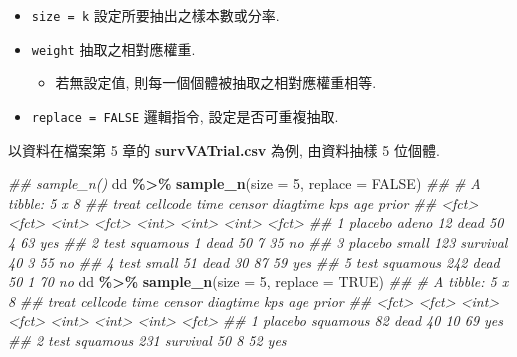 \documentclass[
]{book}
\newenvironment{Shaded}{\begin{snugshade}}{\end{snugshade}}
\newcommand{\CommentTok}[1]{\textcolor[rgb]{0.56,0.35,0.01}{\textit{#1}}}
\newcommand{\DataTypeTok}[1]{\textcolor[rgb]{0.13,0.29,0.53}{#1}}
\newcommand{\DecValTok}[1]{\textcolor[rgb]{0.00,0.00,0.81}{#1}}
\newcommand{\KeywordTok}[1]{\textcolor[rgb]{0.13,0.29,0.53}{\textbf{#1}}}
\newcommand{\NormalTok}[1]{#1}
\newcommand{\OperatorTok}[1]{\textcolor[rgb]{0.81,0.36,0.00}{\textbf{#1}}}
\newcommand{\OtherTok}[1]{\textcolor[rgb]{0.56,0.35,0.01}{#1}}
\newcommand{\StringTok}[1]{\textcolor[rgb]{0.31,0.60,0.02}{#1}}
\providecommand{\tightlist}{%
  \setlength{\itemsep}{0pt}\setlength{\parskip}{0pt}}
\begin{document}
\begin{itemize}
\tightlist
\item
  \texttt{size\ =\ k} 設定所要抽出之樣本數或分率.
\item
  \texttt{weight} 抽取之相對應權重.

  \begin{itemize}
  \tightlist
  \item
    若無設定值, 則每一個個體被抽取之相對應權重相等.
  \end{itemize}
\item
  \texttt{replace\ =\ FALSE} 邏輯指令, 設定是否可重複抽取.
\end{itemize}

以資料在檔案第 5 章的 \textbf{survVATrial.csv} 為例,
由資料抽樣 5 位個體.

\begin{Shaded}
\begin{Highlighting}[]
\CommentTok{\#\# sample\_n()}
\NormalTok{dd }\OperatorTok{\%\textgreater{}\%}\StringTok{ }\KeywordTok{sample\_n}\NormalTok{(}\DataTypeTok{size =} \DecValTok{5}\NormalTok{, }\DataTypeTok{replace =} \OtherTok{FALSE}\NormalTok{)}
\CommentTok{\#\# \# A tibble: 5 x 8}
\CommentTok{\#\#   treat   cellcode  time censor   diagtime   kps   age prior}
\CommentTok{\#\#   \textless{}fct\textgreater{}   \textless{}fct\textgreater{}    \textless{}int\textgreater{} \textless{}fct\textgreater{}       \textless{}int\textgreater{} \textless{}int\textgreater{} \textless{}int\textgreater{} \textless{}fct\textgreater{}}
\CommentTok{\#\# 1 placebo adeno       12 dead           50     4    63 yes  }
\CommentTok{\#\# 2 test    squamous     1 dead           50     7    35 no   }
\CommentTok{\#\# 3 placebo small      123 survival       40     3    55 no   }
\CommentTok{\#\# 4 test    small       51 dead           30    87    59 yes  }
\CommentTok{\#\# 5 test    squamous   242 dead           50     1    70 no}
\NormalTok{dd }\OperatorTok{\%\textgreater{}\%}\StringTok{ }\KeywordTok{sample\_n}\NormalTok{(}\DataTypeTok{size =} \DecValTok{5}\NormalTok{, }\DataTypeTok{replace =} \OtherTok{TRUE}\NormalTok{)}
\CommentTok{\#\# \# A tibble: 5 x 8}
\CommentTok{\#\#   treat   cellcode  time censor   diagtime   kps   age prior}
\CommentTok{\#\#   \textless{}fct\textgreater{}   \textless{}fct\textgreater{}    \textless{}int\textgreater{} \textless{}fct\textgreater{}       \textless{}int\textgreater{} \textless{}int\textgreater{} \textless{}int\textgreater{} \textless{}fct\textgreater{}}
\CommentTok{\#\# 1 placebo squamous    82 dead           40    10    69 yes  }
\CommentTok{\#\# 2 test    squamous   231 survival       50     8    52 yes  }

\end{Highlighting}
\end{Shaded}
\end{document}
